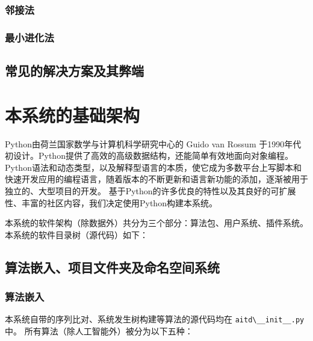 \documentclass{article}
\begin{document}
\begin{multicols}{2}
\subsubsection{邻接法}

\subsubsection{最小进化法}

\subsection{常见的解决方案及其弊端}

\section{本系统的基础架构}
\par
Python由荷兰国家数学与计算机科学研究中心的 Guido van Rossum 于1990年代初设计\cite{ref4}。Python提供了高效的高级数据结构，还能简单有效地面向对象编程。
Python语法和动态类型，以及解释型语言的本质，使它成为多数平台上写脚本和快速开发应用的编程语言，随着版本的不断更新和语言新功能的添加，逐渐被用于独立的、大型项目的开发。
基于Python的许多优良的特性以及其良好的可扩展性、丰富的社区内容，我们决定使用Python构建本系统。
\par
本系统的软件架构（除数据外）共分为三个部分：算法包、用户系统、插件系统。本系统的软件目录树（源代码）如下：
\par
{}

\subsection{算法嵌入、项目文件夹及命名空间系统}

\subsubsection{算法嵌入}
\par
本系统自带的序列比对、系统发生树构建等算法的源代码均在 \verb|aitd\__init__.py| 中。
所有算法（除人工智能外）被分为以下五种：


\end{multicols}
\end{document}
